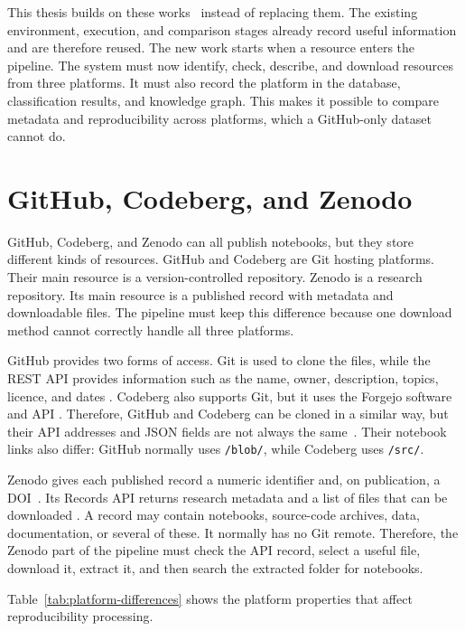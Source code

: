 This thesis builds on these works~\cite{pimentel2019,samuel2024computational,samuel2024fairjupyter} instead of replacing them. The existing environment, execution, and comparison stages already record useful information and are therefore reused. The new work starts when a resource enters the pipeline. The system must now identify, check, describe, and download resources from three platforms. It must also record the platform in the database, classification results, and knowledge graph. This makes it possible to compare metadata and reproducibility across platforms, which a GitHub-only dataset cannot do.

\clearpage
\section{GitHub, Codeberg, and Zenodo}

GitHub, Codeberg, and Zenodo can all publish notebooks, but they store different kinds of resources. GitHub and Codeberg are Git hosting platforms. Their main resource is a version-controlled repository. Zenodo is a research repository. Its main resource is a published record with metadata and downloadable files. The pipeline must keep this difference because one download method cannot correctly handle all three platforms.

GitHub provides two forms of access. Git is used to clone the files, while the REST API provides information such as the name, owner, description, topics, licence, and dates \cite{githubapi}. Codeberg also supports Git, but it uses the Forgejo software and API \cite{codebergdocs,forgejoapi}. Therefore, GitHub and Codeberg can be cloned in a similar way, but their API addresses and JSON fields are not always the same~\cite{codebergapi}. Their notebook links also differ: GitHub normally uses \texttt{/blob/}, while Codeberg uses \texttt{/src/}.

Zenodo gives each published record a numeric identifier and, on publication, a DOI~\cite{zenodoapi}. Its Records API returns research metadata and a list of files that can be downloaded \cite{zenodoapi}. A record may contain notebooks, source-code archives, data, documentation, or several of these. It normally has no Git remote. Therefore, the Zenodo part of the pipeline must check the API record, select a useful file, download it, extract it, and then search the extracted folder for notebooks.

Table~\ref{tab:platform-differences} shows the platform properties that affect reproducibility processing.

